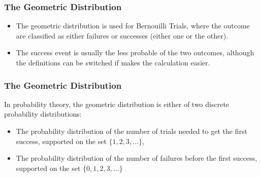 
\begin{frame}
\frametitle{The Geometric Distribution}
\Large
\vspace{-1.5cm}
\begin{itemize}
\item The geometric distribution is used for Bernouilli Trials, where the outcome are classified as either failures or successes (either one or the other).
\item The success event is usually the less probable of the two outcomes, although the definitions can be switched if makes the calculation easier.
\end{itemize} 

\end{frame}

\begin{frame}
\frametitle{The Geometric Distribution}
\Large

In probability theory, the geometric distribution is either of two discrete probability distributions:
\begin{itemize}
\item The probability distribution of the number of trials needed to get the first success, supported on the set $\{ 1, 2, 3, \ldots\}$, \bigskip
\item The probability distribution of the number of failures before the first success, supported on the set $\{ 0, 1, 2, 3, \ldots\}$
\end{itemize}
\end{frame}

